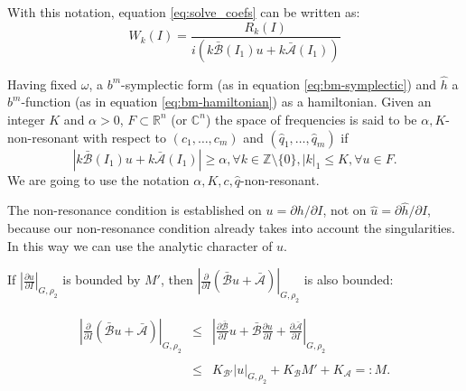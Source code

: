 \begin{remark}
With this notation, equation \ref{eq:solve_coefs} can be written as:
\begin{equation}\label{eq:solve_coefs_simplified}
W_k(I) = \frac{R_k(I)}{i(k \bar{\mathcal{B}}(I_1) u + k \bar{\mathcal{A}}(I_1))}
\end{equation}


\end{remark}

\begin{definition}
Having fixed $\omega$, a $b^m$-symplectic form (as in equation \ref{eq:bm-symplectic}) and $\hat{h}$ a $b^m$-function (as in equation \ref{eq:bm-hamiltonian}) as a hamiltonian. Given an integer $K$ and $\alpha > 0$, $F \subset \mathbb{R}^n$ (or $\mathbb{C}^n$) the space of frequencies is said to be $\alpha, K$-non-resonant with respect to $(c_1,\ldots,c_m)$ and $(\hat{q}_1,\ldots, \hat{q}_m)$ if
$$|k \bar{\mathcal{B}}(I_1) u + k \bar{\mathcal{A}}(I_1)|\geq \alpha, \forall k \in \mathbb{Z}\setminus \{0\}, |k|_1\leq K, \forall u \in F.$$
We are going to use the notation $\alpha, K, c,\hat{q}$-non-resonant.
\end{definition}



\begin{remark}
The non-resonance condition is established on $u = \partial h/\partial I$, not on $\hat{u} = \partial \hat h/\partial I$, because our non-resonance condition already takes into account the singularities. In this way we can use the analytic character of $u$.
\end{remark}

\begin{remark}
If $\left|\frac{\partial u}{\partial I}\right|_{G,\rho_2}$ is bounded by $M'$,  then $\left|\frac{\partial }{\partial I}\left( \bar{\mathcal{B}}u + \bar{\mathcal{A}}\right)\right|_{G,\rho_2}$ is also bounded:

\begin{equation}\label{eq:M_def}
\begin{array}{rcl}
\left|\frac{\partial }{\partial I}\left( \bar{\mathcal{B}}u + \bar{\mathcal{A}}\right)\right|_{G,\rho_2} &
 \leq &
 \left|\frac{\partial \bar{\mathcal{B}}}{\partial I} u
  + \bar{\mathcal{B}} \frac{\partial u}{\partial I}
   + \frac{\partial \bar{\mathcal{A}}}{\partial I}\right|_{G,\rho_2}\\
\\
& \leq & K_{\mathcal{B}'} |u|_{G,\rho_2} + K_{\mathcal{B}}M' + K_{\mathcal{A}} =: M.\\
\\
\end{array}
\end{equation}

\end{remark}

